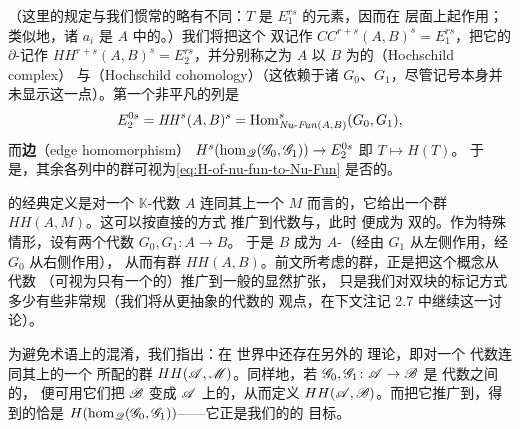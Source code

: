 （这里的规定与我们惯常的略有不同：$T$ 是 $E_1^{rs}$ 的元素，因而在\trCohomology{}%
层面上起作用；类似地，诸 $a_i$ 是 $A$ 中的\trMorphism{}。）我们将把这个
双\trGraded\trComplex{}记作 $\mathit{CC}^{r+s}(A,B)^s=E_1^{rs}$，把它的
$\partial$-\trCohomology{}记作 $\mathit{HH}^{r+s}(A,B)^s=E_2^{rs}$，并分别称之为
$A$ 以 $B$ 为\trCoefficients{}的\textbf{\trHochschild{}\trComplex}（Hochschild complex）
与\textbf{\trHochschildCohomology}（Hochschild cohomology）（这依赖于诸\trFunctor{}%
$G_0$、$G_1$，尽管记号本身并未显示这一点）。第一个非平凡的列是
\begin{equation*}
E_2^{0s}=\mathit{HH}^s(A,B)^s=\operatorname{Hom}^{s}_{\mathit{Nu}\text{-}\mathit{Fun}(A,B)}(G_0,G_1),
\end{equation*}
而\textbf{边\trHomomorphism}（edge homomorphism）
$H^s(\hom_{\mathscr{Q}}(\mathscr{G}_0,\mathscr{G}_1))\to E_2^{0s}$ 即 $T\mapsto H(T)$。
于是，其余各列中的\trHochschildCohomology{}群可视为\eqref{eq:H-of-nu-fun-to-Nu-Fun}
是否\trFullyFaithful{}的\trObstruction。
\begin{remark}\label{thm:hochschild-classical-definition}
\trHochschildCohomology{}的经典定义是对一个 $\mathbb{K}$-代数 $A$ 连同其上一个\trBimodule{}%
$M$ 而言的，它给出一个\trGraded{}群 $HH(A,M)$。这可以按直接的方式
推广到\trGraded{}代数与\trBimodule，此时 \trHochschildCohomology{}便成为
双\trGraded{}的。作为特殊情形，设有两个代数\trHomomorphism{} $G_0,G_1\colon A\to B$。
于是 $B$ 成为 $A$-\trBimodule（经由 $G_1$ 从左侧作用，经 $G_0$ 从右侧作用），
从而有\trHochschildCohomology{}群 $HH(A,B)$。前文所考虑的群，正是把这个概念从代数
（可视为只有一个\trObject{}的\trCategory{}）推广到一般\trCategory{}的显然扩张，
只是我们对双\trGraded{}块的标记方式多少有些非常规（我们将从更抽象的\trHomology{}代数的
观点，在下文注记 2.7 中继续这一讨论）。

为避免术语上的混淆，我们指出：在 \trAinfty{}世界中还存在另外的\trHochschildCohomology{}%
理论，即对一个 \trAinfty{}代数连同其上的一个\trAinfty\trBimodule{}%
所配的\trGraded{}群 $HH(\mathscr{A},\mathscr{M})$。同样地，若
$\mathscr{G}_0,\mathscr{G}_1\colon\mathscr{A}\to\mathscr{B}$ 是 \trAinfty{}代数之间的\trHomomorphism，
便可用它们把 $\mathscr{B}$ 变成 $\mathscr{A}$ 上的\trAinfty\trBimodule，从而定义
$HH(\mathscr{A},\mathscr{B})$。而把它推广到\trACategory，得到的恰是\trCohomology{}%
$H(\hom_{\mathscr{Q}}(\mathscr{G}_0,\mathscr{G}_1))$——它正是我们的\trSpectralSequence{}的
目标。
\end{remark}
